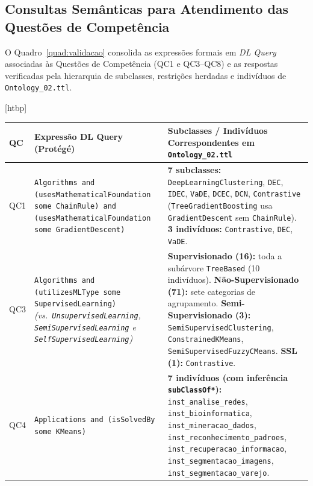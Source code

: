 \documentclass[11pt,a4paper]{article}
\makeatletter
\newcommand{\onto}[1]{\texttt{#1}}
\newcounter{quadro}
\newenvironment{quadro}{\@float{quadro}}{\end@float}
\makeatother
\begin{document}
\subsection{Consultas Semânticas para Atendimento das Questões de Competência}

O Quadro~\ref{quad:validacao} consolida as expressões formais em \emph{DL Query} associadas às Questões de Competência (QC1 e QC3--QC8) e as respostas verificadas pela hierarquia de subclasses, restrições herdadas e indivíduos de \texttt{Ontology\_02.ttl}.

\begin{quadro}[htbp]
\centering
\caption{Expressões \emph{DL Query} e resultados verificados sobre \texttt{Ontology\_02.ttl} ao término do Ciclo~2.}
\label{quad:validacao}
\footnotesize
\begin{tabularx}{\textwidth}{@{}p{0.8cm}>{\raggedright\arraybackslash}p{5.8cm}>{\raggedright\arraybackslash}X@{}}
\toprule
\textbf{QC} & \textbf{Expressão DL Query (Protégé)} & \textbf{Subclasses / Indivíduos Correspondentes em \texttt{Ontology\_02.ttl}} \\
\midrule
QC1 & \onto{Algorithms and (usesMathematicalFoundation some ChainRule) and (usesMathematicalFoundation some GradientDescent)} & \textbf{7 subclasses:} \onto{DeepLearningClustering}, \onto{DEC}, \onto{IDEC}, \onto{VaDE}, \onto{DCEC}, \onto{DCN}, \onto{Contrastive} (\onto{TreeGradientBoosting} usa \onto{GradientDescent} sem \onto{ChainRule}). \newline \textbf{3 indivíduos:} \onto{Contrastive}, \onto{DEC}, \onto{VaDE}. \\
\addlinespace[4pt]
QC3 & \onto{Algorithms and (utilizesMLType some SupervisedLearning)} \newline \emph{(vs.\ \onto{UnsupervisedLearning}, \onto{SemiSupervisedLearning} e \onto{SelfSupervisedLearning})} & \textbf{Supervisionado (16):} toda a subárvore \onto{TreeBased} (10 indivíduos). \newline \textbf{Não-Supervisionado (71):} sete categorias de agrupamento. \newline \textbf{Semi-Supervisionado (3):} \onto{SemiSupervisedClustering}, \onto{ConstrainedKMeans}, \onto{SemiSupervisedFuzzyCMeans}. \newline \textbf{SSL (1):} \onto{Contrastive}. \\
\addlinespace[4pt]
QC4 & \onto{Applications and (isSolvedBy some KMeans)} & \textbf{7 indivíduos (com inferência \onto{subClassOf*}):} \onto{inst\_analise\_redes}, \onto{inst\_bioinformatica}, \onto{inst\_mineracao\_dados}, \onto{inst\_reconhecimento\_padroes}, \onto{inst\_recuperacao\_informacao}, \onto{inst\_segmentacao\_imagens}, \onto{inst\_segmentacao\_varejo}. \\

\end{tabularx}
\end{quadro}
\end{document}
